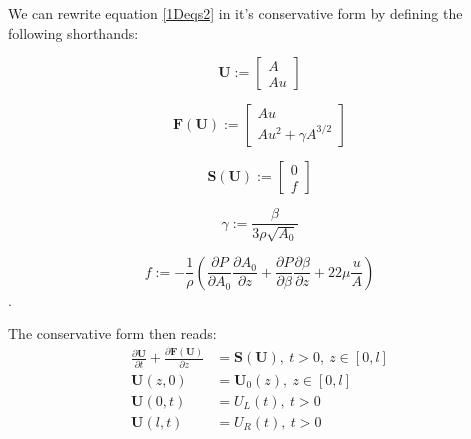 \documentclass[a4paper, oneside]{discothesis}
\begin{document}
We can rewrite equation \ref{1Deqs2} in it's conservative form by defining the following shorthands:

\begin{equation}
	\mathbf{U} := 
	\left[ 
		\begin{aligned}
			A \\
			Au
		\end{aligned}
	\right]
\end{equation}

\begin{equation}
	\mathbf{F} \left( \mathbf{U} \right) := 
	\left[ 
		\begin{aligned}
			Au \\
			Au^2 + \gamma A^{3/2}
		\end{aligned}
	\right]
\end{equation}

\begin{equation}
	\mathbf{S} \left( \mathbf{U} \right) := 
	\left[ 
		\begin{aligned}
			0 \\
			f
		\end{aligned}
	\right]
\end{equation}

\begin{equation}
	\gamma := \frac{\beta}{3\rho\sqrt{A_0}}
\end{equation}

\begin{equation}
	f := -\frac{1}{\rho} \left( \frac{\partial P}{\partial A_0} \frac{\partial A_0}{\partial z} + \frac{\partial P}{\partial \beta} \frac{\partial \beta}{\partial z} + 22\mu\frac{u}{A} \right)
\end{equation}.

The conservative form then reads:
\begin{equation}
	\begin{aligned}
		\frac{\partial \mathbf{U}}{\partial t} + \frac{\partial \mathbf{F} \left( \mathbf{U} \right)}{\partial z} &= \mathbf{S} \left( \mathbf{U} \right), \ t>0, \ z \in \left[ 0,l \right] \\
		\mathbf{U} \left( z,0 \right) &= \mathbf{U}_0 \left( z \right), \ z \in \left[ 0,l \right] \\
		\mathbf{U} \left( 0,t \right) &= U_L \left( t \right), \ t>0\\
		\mathbf{U} \left( l,t \right) &= U_R \left( t \right), \ t>0
	\end{aligned} \label{eq:1deqs3}
\end{equation}
\end{document}
